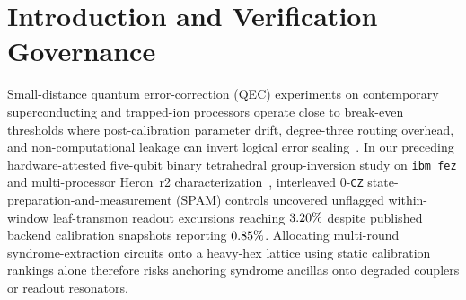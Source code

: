 \documentclass[aps,prx,twocolumn,superscriptaddress,nofootinbib]{revtex4-2}
\begin{document}
\begin{abstract}
trace-preserving (CPTP) five-qutrit ($3^5 = \ecqQutritDim$-state) trajectory and quantum-instrument engine proves that at $p_{\mathrm{leak,CZ}} = \ecqPLeakHigh$, unreset $|2\rangle$ populations inflate $[[3,1,3]]$ $\epsilon_L$ by \ecqLruNoHighInflX\ to $\ecqLruNoHighSlope$ (\texttt{NO\_LRU}) versus $\ecqLruAncHighSlope$ (\texttt{ANCILLA\_LRU\_ONLY}), whereas full ancilla plus data \texttt{DQLR}/\texttt{SWAP-LRU} suppresses $\epsilon_L$ to $\ecqLruFullHighSlope$ and preserves $R_{\mathrm{cross}} = 1$ across all regimes (\ecqLruVerdict).
\end{abstract}

\maketitle

\section{Introduction and Verification Governance}
Small-distance quantum error-correction (QEC) experiments on contemporary superconducting and trapped-ion processors operate close to break-even thresholds where post-calibration parameter drift, degree-three routing overhead, and non-computational leakage can invert logical error scaling~\cite{GoogleSurface2023,MiaoLeakage2023,ChamberlandHeavyHex2020,QuantinuumLogical2024}. In our preceding hardware-attested five-qubit binary tetrahedral group-inversion study on \texttt{ibm\_fez} and multi-processor Heron~r2 characterization~\cite{DavisRO0607Zenodo2026,DavisTMAP02Zenodo2026}, interleaved $0$-\texttt{CZ} state-preparation-and-measurement (SPAM) controls uncovered unflagged within-window leaf-transmon readout excursions reaching $3.20\%$ despite published backend calibration snapshots reporting $0.85\%$. Allocating multi-round syndrome-extraction circuits onto a heavy-hex lattice using static calibration rankings alone therefore risks anchoring syndrome ancillas onto degraded couplers or readout resonators.
\end{document}
